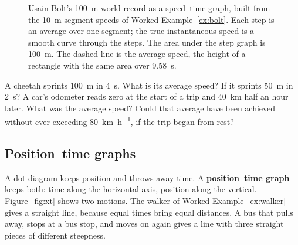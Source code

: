 \documentclass[11pt,twoside,openany]{book}
\newcounter{check}[chapter]
\begin{document}
\begin{figure}[htb]
\centering
{}
\caption{Usain Bolt's \SI{100}{\metre} world record as a speed--time graph, built from the \SI{10}{\metre} segment speeds of Worked Example~\ref{ex:bolt}. Each step is an average over one segment; the true instantaneous speed is a smooth curve through the steps. The area under the step graph is \SI{100}{\metre}. The dashed line is the average speed, the height of a rectangle with the same area over \SI{9.58}{\second}.}
\label{fig:boltplot}
\end{figure}

\begin{checkbox}
A cheetah sprints \SI{100}{\metre} in \SI{4}{\second}. What is its average speed? If it sprints \SI{50}{\metre} in \SI{2}{\second}? A car's odometer reads zero at the start of a trip and \SI{40}{\kilo\metre} half an hour later. What was the average speed? Could that average have been achieved without ever exceeding \SI{80}{\kilo\metre\per\hour}, if the trip began from rest?
\end{checkbox}

\subsection{Position--time graphs}
\label{sec:graphs}

A dot diagram keeps position and throws away time. A \textbf{position--time graph} keeps both: time along the horizontal axis, position along the vertical. Figure~\ref{fig:xt} shows two motions. The walker of Worked Example~\ref{ex:walker} gives a straight line, because equal times bring equal distances. A bus that pulls away, stops at a bus stop, and moves on again gives a line with three straight pieces of different steepness.
\end{document}
